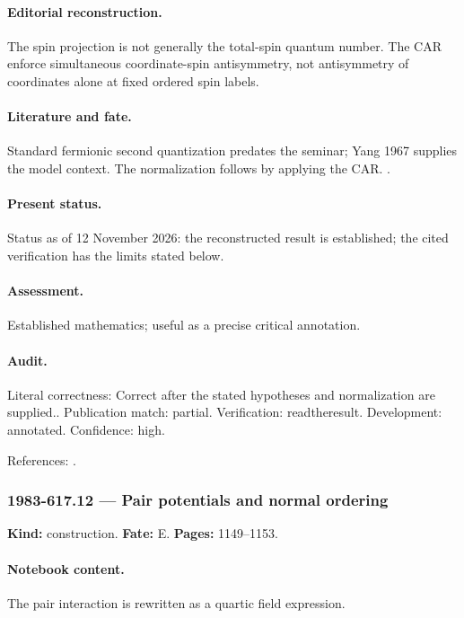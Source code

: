 \paragraph{Editorial reconstruction.} The spin projection is not generally the total-spin quantum number. The CAR enforce simultaneous coordinate-spin antisymmetry, not antisymmetry of coordinates alone at fixed ordered spin labels.

\paragraph{Literature and fate.} Standard fermionic second quantization predates the seminar; Yang 1967 supplies the model context. The normalization follows by applying the CAR. \citep{yang1967manybody}.

\paragraph{Present status.} Status as of 12 November 2026: the reconstructed result is established; the cited verification has the limits stated below.

\paragraph{Assessment.} Established mathematics; useful as a precise critical annotation.

\paragraph{Audit.} Literal correctness: Correct after the stated hypotheses and normalization are supplied.. Publication match: partial. Verification: readtheresult. Development: annotated. Confidence: high.

\noindent References: \citep{yang1967manybody}.\par

\subsubsection{1983-617.12 --- Pair potentials and normal ordering}

\label{item:1983-617.12}

\noindent\textbf{Kind:} construction. \textbf{Fate:} E. \textbf{Pages:} 1149--1153.\par

\paragraph{Notebook content.} The pair interaction is rewritten as a quartic field expression.

